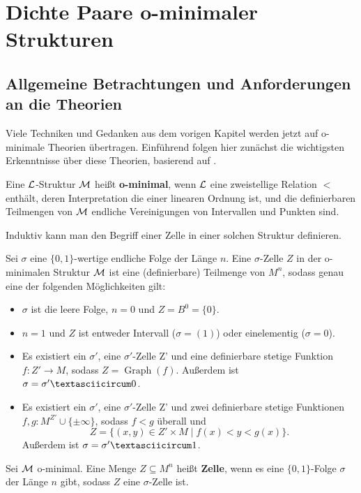 \chapter{Dichte Paare o-minimaler Strukturen}
\section{Allgemeine Betrachtungen und Anforderungen an die Theorien}
Viele Techniken und Gedanken aus dem vorigen Kapitel werden jetzt auf o-minimale Theorien übertragen. Einführend folgen hier zunächst die wichtigsten Erkenntnisse über diese Theorien, basierend auf \cite{vdDZellzerlegung}.

\begin{definition}
	Eine $\mathcal{L}$-Struktur $\mathcal{M}$ heißt \textbf{o-minimal}, wenn $\mathcal{L}$ eine zweistellige Relation $<$ enthält, deren Interpretation die einer linearen Ordnung ist, und die definierbaren Teilmengen von $\mathcal{M}$ endliche Vereinigungen von Intervallen und Punkten sind.
\end{definition}

Induktiv kann man den Begriff einer Zelle in einer solchen Struktur definieren.
\begin{definition}
	Sei $\sigma$ eine $\{0,1\}$-wertige endliche Folge der Länge $n$. Eine $\sigma$-Zelle $Z$ in der o-minimalen Struktur $\mathcal{M}$ ist eine (definierbare) Teilmenge von $M^n$, sodass genau eine der folgenden Möglichkeiten gilt:
	\begin{itemize}
		\item $\sigma$ ist die leere Folge, $n=0$ und $Z=B^0=\{0\}$.
		\item $n=1$ und $Z$ ist entweder Intervall ($\sigma=(1)$) oder einelementig ($\sigma=0$).
		\item Es existiert ein $\sigma'$, eine $\sigma'$-Zelle Z' und eine definierbare stetige Funktion $f:Z'\rightarrow M$, sodass $Z=\operatorname{Graph}(f)$. Außerdem ist $\sigma=\sigma'\textasciicircum0$.
		\item Es existiert ein $\sigma'$, eine $\sigma'$-Zelle Z' und zwei definierbare stetige Funktionen $f,g:M^{Z'}\cup\{\pm\infty\}$, sodass $f<g$ überall und $$Z=\{(x,y)\in Z'\times M\mid f(x)<y<g(x)\}.$$ Außerdem ist $\sigma=\sigma'\textasciicircum1$.
	\end{itemize}
\end{definition}
\begin{definition}
	Sei $\mathcal{M}$ o-minimal. Eine Menge $Z\subseteq M^n$ heißt \textbf{Zelle}, wenn es eine $\{0,1\}$-Folge $\sigma$ der Länge $n$ gibt, sodass $Z$ eine $\sigma$-Zelle ist.
\end{definition}

